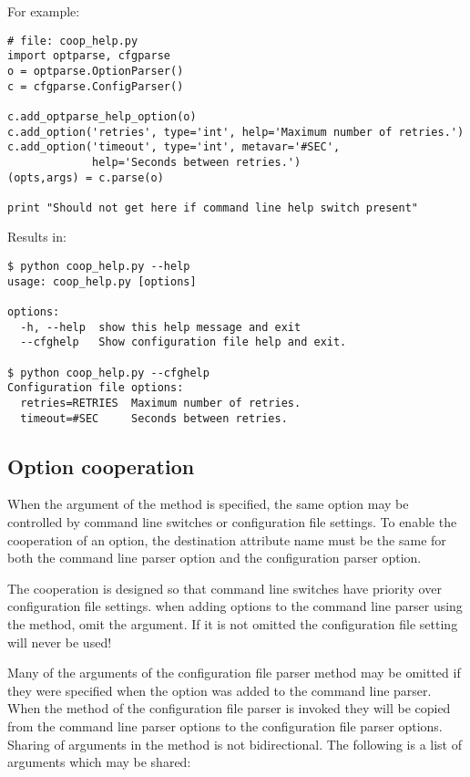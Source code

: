 \documentclass{howto}
\begin{document}
For example:

\begin{verbatim}
# file: coop_help.py
import optparse, cfgparse
o = optparse.OptionParser()
c = cfgparse.ConfigParser()

c.add_optparse_help_option(o)
c.add_option('retries', type='int', help='Maximum number of retries.')
c.add_option('timeout', type='int', metavar='#SEC', 
             help='Seconds between retries.')
(opts,args) = c.parse(o)

print "Should not get here if command line help switch present"
\end{verbatim}

Results in:
\begin{verbatim}
$ python coop_help.py --help
usage: coop_help.py [options]

options:
  -h, --help  show this help message and exit
  --cfghelp   Show configuration file help and exit.

$ python coop_help.py --cfghelp
Configuration file options:
  retries=RETRIES  Maximum number of retries.
  timeout=#SEC     Seconds between retries.
\end{verbatim}

\subsection{Option cooperation\label{cfgparse-coop-option}}

When the  argument of the  method is specified,
the same option may be controlled by command line switches or configuration 
file settings.  To enable the cooperation of an option, the destination 
attribute name must be the same for both the command line parser option and 
the configuration parser option.

The cooperation is designed so that command line switches have priority
over configuration file settings.   when adding
options to the command line parser using the  method,
omit the  argument.  If it is not omitted the 
configuration file setting will never be used!

Many of the arguments of the configuration file parser 
method may be omitted if they were specified when the option was added to 
the command line parser.  When the  method of the configuration
file parser is invoked they will be copied from the command line parser options
to the configuration file parser options.  Sharing of arguments in the  
method is not bidirectional.  The following is a list of arguments
which may be shared:
\end{document}
